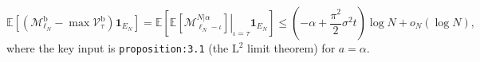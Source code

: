 \[
    \mathbb E\!\left[
        \left(
            \mathcal M_{\ell_N}^{\mathrm b}
            -
            \max\mathcal V^{\mathrm b}_\tau
        \right)\mathbf 1_{E_N}
    \right]
    =
    \mathbb E\!\left[
        \left.\mathbb E\!\left[
            \mathcal M^{N|\alpha}_{\ell_N-\iota}
        \right]\right|_{\iota=\tau}\mathbf 1_{E_N}
    \right]
    \le
    \left(-\alpha+\frac{\pi^2}{2}\sigma^2 t\right)\log N+o_N(\log N),
\]
where the key input is \texttt{proposition:3.1} (the $\mathrm L^2$ limit theorem) for $a=\alpha$.
